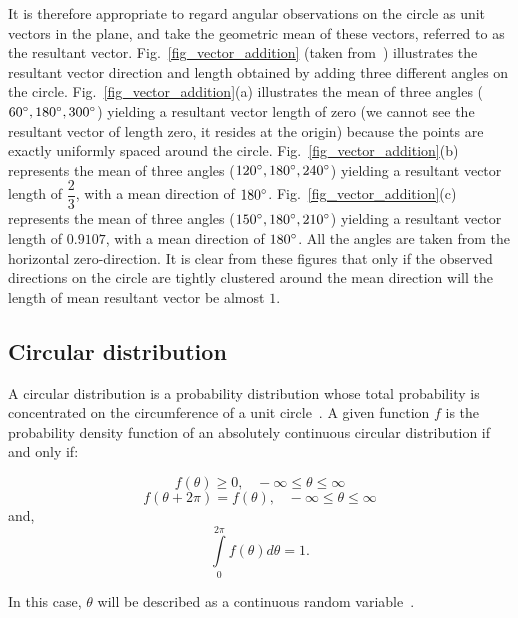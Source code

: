 \documentclass[10pt,journal,cspaper,compsoc]{IEEEtran}
\begin{document}
It is therefore appropriate to regard angular observations on the circle as unit vectors in the plane, and take the geometric mean of these vectors, referred to as the resultant vector. Fig.~\ref{fig_vector_addition} (taken from~\cite{berens2009circstat}) illustrates the resultant vector direction and length obtained by adding three different angles on the circle. Fig.~\ref{fig_vector_addition}(a) illustrates the mean of three angles ($60\degree, 180\degree, 300\degree$) yielding a resultant vector length of zero (we cannot see the resultant vector of length zero, it resides at the origin) because the points are exactly uniformly spaced around the circle. Fig.~\ref{fig_vector_addition}(b) represents the mean of three angles ($120\degree, 180\degree, 240\degree$) yielding a resultant vector length of $\dfrac{2}{3}$, with a mean direction of $180\degree$. Fig.~\ref{fig_vector_addition}(c) represents the mean of three angles ($150\degree, 180\degree, 210\degree$) yielding a resultant vector length of $0.9107$, with a mean direction of $180\degree$. All the angles are taken from the horizontal zero-direction. It is clear from these figures that only if the observed directions on the circle are tightly clustered around the mean direction will the length of mean resultant vector be almost $1$.

\subsection{Circular distribution}
A circular distribution is a probability distribution whose total probability is concentrated on the circumference of a unit circle~\cite{jammalamadaka2001topics}. A given function $f$ is the probability density function of an absolutely continuous circular distribution if and only if:

\begin{equation}
f(\theta) \geq 0, \;\;\; -\infty \leq \theta \leq \infty
\end{equation}
\begin{equation}
f(\theta+2\pi) = f(\theta), \;\;\; -\infty \leq \theta \leq \infty
\end{equation}
\noindent and,
\begin{equation}
\int \limits_{0}^{2\pi} f(\theta) d\theta=1.
\end{equation}

\noindent In this case, $\theta$ will be described as a continuous random variable~\cite{mardia1972statistics}.
\end{document}
